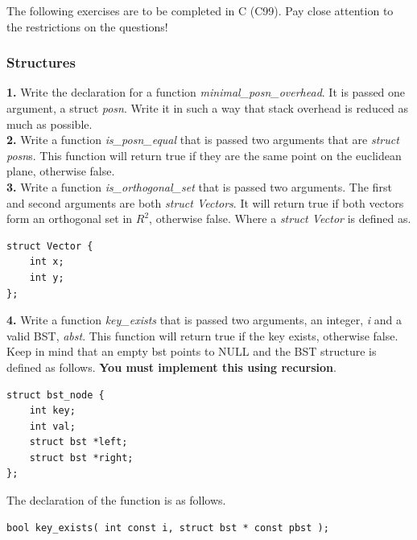 \documentclass[12pt,extarticle]{article}
\begin{document}
The following exercises are to be completed in C (C99). Pay close attention to the restrictions on the questions!

\subsubsection{Structures}

\textbf{1.} Write the declaration for a function \emph{minimal\_posn\_overhead}. It is passed one argument, a struct \emph{posn}. Write it in such a way that stack overhead is reduced as much as possible.\\

\noindent
\textbf{2.} Write a function \emph{is\_posn\_equal} that is passed two arguments that are \emph{struct posn}s. This function will return true if they are the same point on the euclidean plane, otherwise false.\\

\noindent
\textbf{3.} Write a function \emph{is\_orthogonal\_set} that is passed two arguments. The first and second arguments are both \emph{struct Vectors}. It will return true if both vectors form an orthogonal set in $R^{2}$, otherwise false. Where a \emph{struct Vector} is defined as.\\

\lstset {
	language=Lisp
}
\begin{lstlisting}
struct Vector {
	int x;
	int y;
};
\end{lstlisting}

\noindent
\textbf{4.} Write a function \emph{key\_exists} that is passed two arguments, an integer, \textit{i} and a valid BST, \textit{abst}. This function will return true if the key exists, otherwise false. Keep in mind that an empty bst points to NULL and the BST structure is defined as follows. \textbf{You must implement this using recursion}.\\

\lstset {
	language=c
}
\begin{lstlisting}
struct bst_node {
	int key;
	int val;
	struct bst *left;
	struct bst *right;
};
\end{lstlisting}

The declaration of the function is as follows.\\

\lstset {
	language=c
}
\begin{lstlisting}
bool key_exists( int const i, struct bst * const pbst );
\end{lstlisting}
\end{document}
